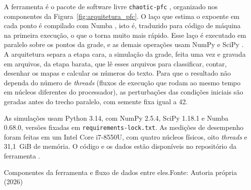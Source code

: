 \documentclass{pfccefsa}
\newcommand{\estr}[1]{\textit{#1}}
\newcommand{\comp}[2]{\textbf{#1}\\[-1pt]{#2}}
\begin{document}
A ferramenta é o pacote de software livre
\texttt{chaotic-pfc} \cite{chaoticPFC2026}, organizado nos componentes da
Figura~\ref{fig:arquitetura_pfc}. O laço que estima o expoente em cada ponto é compilado com Numba
\cite{Lam2015}, isto é, traduzido para código de máquina na primeira execução, o
que o torna muito mais rápido. Esse laço é executado em paralelo sobre os pontos
da grade, e as demais operações usam NumPy e SciPy
\cite{Harris2020,Virtanen2020}.
A arquitetura separa a etapa cara, a simulação da grade, feita uma vez e
gravada em arquivos, da etapa barata, que lê esses arquivos para classificar,
contar, desenhar os mapas e calcular os números do texto. Para que
o resultado não dependa do número de \estr{threads} (fluxos de execução que rodam
ao mesmo tempo em núcleos diferentes do processador), as perturbações das
condições
iniciais são geradas antes do trecho paralelo, com semente fixa igual a 42.

As simulações usam Python 3.14, com NumPy 2.5.4, SciPy 1.18.1 e Numba 0.68.0,
versões fixadas em \texttt{requirements-lock.txt}. As medições de desempenho
foram feitas em um Intel Core i7-8550U, com quatro núcleos físicos, oito \estr{threads}
e 31,1~GiB de memória. O código e os dados estão disponíveis no repositório da ferramenta
\cite{chaoticPFC2026}.

\begin{figura}{Componentes da ferramenta e fluxo de dados entre eles.}{Fonte:
Autoria própria (2026)}
\label{fig:arquitetura_pfc}
\end{figura}
\end{document}
